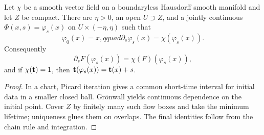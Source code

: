 \begin{lemma}
\label{lem:vector-field-flow-near-compact}
\leanok


Let $\chi$ be a smooth vector field on a boundaryless Hausdorff smooth
manifold and let $Z$ be compact. There are $\eta>0$, an open
$U\supset Z$, and a jointly continuous
$\Phi(x,s)=\varphi_s(x)$ on $U\times(-\eta,\eta)$ such that
$$\varphi_0(x)=x,qquad \partial_s\varphi_s(x)=\chi(\varphi_s(x)).$$
Consequently
$$\partial_sF(\varphi_s(x))=\chi(F)(\varphi_s(x)),$$
and if $\chi({\bf t})=1$, then
${\bf t}(\varphi_s(x))={\bf t}(x)+s$.
\end{lemma}
\begin{proof}
\sketch
\leanok
In a chart, Picard iteration gives a common short-time interval for
initial data in a smaller closed ball. Gr\"onwall yields continuous
dependence on the initial point. Cover $Z$ by finitely many such flow
boxes and take the minimum lifetime; uniqueness glues them on overlaps.
The final identities follow from the chain rule and integration.
\end{proof}

